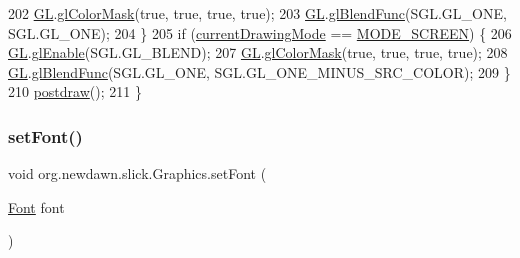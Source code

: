 \begin{DoxyCode}
202             \mbox{\hyperlink{classorg_1_1newdawn_1_1slick_1_1_graphics_a39ca68db81b225982a4421c4a6835eed}{GL}}.\mbox{\hyperlink{interfaceorg_1_1newdawn_1_1slick_1_1opengl_1_1renderer_1_1_s_g_l_a35f9b484d84c168623bc7236152f2d50}{glColorMask}}(\textcolor{keyword}{true}, \textcolor{keyword}{true}, \textcolor{keyword}{true}, \textcolor{keyword}{true});
203             \mbox{\hyperlink{classorg_1_1newdawn_1_1slick_1_1_graphics_a39ca68db81b225982a4421c4a6835eed}{GL}}.\mbox{\hyperlink{interfaceorg_1_1newdawn_1_1slick_1_1opengl_1_1renderer_1_1_s_g_l_afa605b9f35a519c10dbed88c79be96af}{glBlendFunc}}(SGL.GL\_ONE, SGL.GL\_ONE);
204         \}
205         \textcolor{keywordflow}{if} (\mbox{\hyperlink{classorg_1_1newdawn_1_1slick_1_1_graphics_ac16a9a1c8d01b16444ba0851570d1588}{currentDrawingMode}} == \mbox{\hyperlink{classorg_1_1newdawn_1_1slick_1_1_graphics_aa6acd283f373a2f8a1239a74aa5c004d}{MODE\_SCREEN}}) \{
206             \mbox{\hyperlink{classorg_1_1newdawn_1_1slick_1_1_graphics_a39ca68db81b225982a4421c4a6835eed}{GL}}.\mbox{\hyperlink{interfaceorg_1_1newdawn_1_1slick_1_1opengl_1_1renderer_1_1_s_g_l_a35991f93081980b303d6ccc5bd88c8da}{glEnable}}(SGL.GL\_BLEND);
207             \mbox{\hyperlink{classorg_1_1newdawn_1_1slick_1_1_graphics_a39ca68db81b225982a4421c4a6835eed}{GL}}.\mbox{\hyperlink{interfaceorg_1_1newdawn_1_1slick_1_1opengl_1_1renderer_1_1_s_g_l_a35f9b484d84c168623bc7236152f2d50}{glColorMask}}(\textcolor{keyword}{true}, \textcolor{keyword}{true}, \textcolor{keyword}{true}, \textcolor{keyword}{true});
208             \mbox{\hyperlink{classorg_1_1newdawn_1_1slick_1_1_graphics_a39ca68db81b225982a4421c4a6835eed}{GL}}.\mbox{\hyperlink{interfaceorg_1_1newdawn_1_1slick_1_1opengl_1_1renderer_1_1_s_g_l_afa605b9f35a519c10dbed88c79be96af}{glBlendFunc}}(SGL.GL\_ONE, SGL.GL\_ONE\_MINUS\_SRC\_COLOR);
209         \}
210         \mbox{\hyperlink{classorg_1_1newdawn_1_1slick_1_1_graphics_abe054371d1486618ff327bbbcf02ff97}{postdraw}}();
211     \}
\end{DoxyCode}
\mbox{\label{classorg_1_1newdawn_1_1slick_1_1_graphics_a610ac6be8d21ad1d5129c66b6a32f1bf}} 
\subsubsection{\texorpdfstring{set\+Font()}{setFont()}}
{\footnotesize\ttfamily void org.\+newdawn.\+slick.\+Graphics.\+set\+Font (\begin{DoxyParamCaption}\item[{\mbox{\hyperlink{interfaceorg_1_1newdawn_1_1slick_1_1_font}{Font}}}]{font }\end{DoxyParamCaption})\hspace{0.3cm}{\ttfamily [inline]}}

